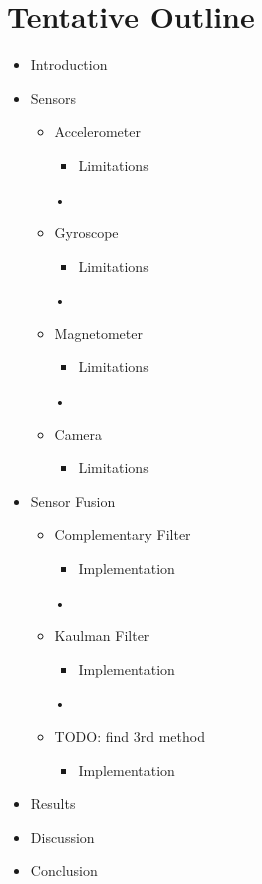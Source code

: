 \documentclass[11pt]{article}
\begin{document}
\section{Tentative Outline}
\begin{itemize}
\item{ Introduction }

\item { Sensors

 \begin{itemize}
\item Accelerometer {

\begin{itemize}
\item Limitations

\end{itemize}•
}
\item Gyroscope {

\begin{itemize}
\item Limitations
\end{itemize}•
}
\item Magnetometer {
\begin{itemize}
\item Limitations
\end{itemize}•
}
\item Camera {
\begin{itemize}
\item Limitations
\end{itemize}
}
\end{itemize}
}

\item { Sensor Fusion
\begin{itemize}
\item Complementary Filter {
\begin{itemize}
\item Implementation
\end{itemize}•
}
\item {Kaulman Filter
\begin{itemize}
\item Implementation
\end{itemize}•
}
\item{ TODO: find 3rd method
\begin{itemize}
\item Implementation
\end{itemize}
}
\end{itemize}

 }

\item Results
\item Discussion
\item Conclusion


\end{itemize}
\end{document}
